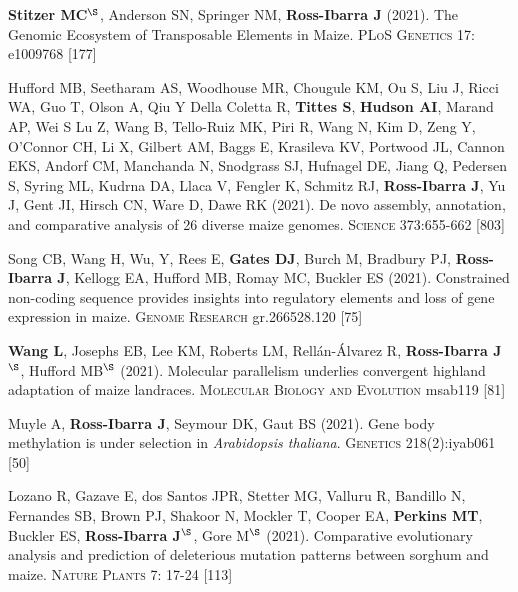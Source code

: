 \documentclass[letterpaper,10pt]{article}
\begin{document}
\begin{etaremune}
\item \textbf{Stitzer MC}$^\S$, Anderson SN, Springer NM, \textbf{Ross-Ibarra J} (2021). The Genomic Ecosystem of Transposable Elements in Maize. \textsc{PLoS Genetics} 17: e1009768
{} [177]\\

\item Hufford MB, Seetharam AS, Woodhouse MR, Chougule KM, Ou S, Liu J, Ricci WA, Guo T, Olson A, Qiu Y Della Coletta R, \textbf{Tittes S}, \textbf{Hudson AI},  Marand AP, Wei S Lu Z, Wang B, Tello-Ruiz MK, Piri R, Wang N, Kim D, Zeng Y, O'Connor CH, Li X, Gilbert AM, Baggs E, Krasileva KV, Portwood JL, Cannon EKS, Andorf CM, Manchanda N, Snodgrass SJ, Hufnagel DE, Jiang Q, Pedersen S, Syring ML, Kudrna DA, Llaca V, Fengler K, Schmitz RJ, \textbf{Ross-Ibarra J}, Yu J, Gent JI, Hirsch CN, Ware D, Dawe RK (2021). De novo assembly, annotation, and comparative analysis of 26 diverse maize genomes. \textsc{Science} 373:655-662
{} [803]\\

\item Song CB, Wang H, Wu, Y, Rees E, \textbf{Gates DJ}, Burch M,  Bradbury PJ, \textbf{Ross-Ibarra J}, Kellogg EA, Hufford MB, Romay MC, Buckler ES (2021).  Constrained non-coding sequence provides insights into regulatory elements and loss of gene expression in maize. \textsc{Genome Research} gr.266528.120 %
{} [75]\\

\item \textbf{Wang L}, Josephs EB, Lee KM, Roberts LM, Rell\'{a}n-\'{A}lvarez R, \textbf{Ross-Ibarra J}$^\S$, Hufford MB$^\S$ (2021). Molecular parallelism underlies convergent highland adaptation of maize landraces. \textsc{Molecular Biology and Evolution} msab119 %
{} [81]\\

\item Muyle A, \textbf{Ross-Ibarra J}, Seymour DK, Gaut BS (2021). Gene body methylation is under selection in \textit{Arabidopsis thaliana}. \textsc{Genetics} 218(2):iyab061 %
{} [50]\\

\item Lozano R, Gazave E, dos Santos JPR, Stetter MG, Valluru R, Bandillo N, Fernandes SB, Brown PJ, Shakoor N, Mockler T, Cooper EA, \textbf{Perkins MT}, Buckler ES, \textbf{Ross-Ibarra J}$^\S$, Gore M$^\S$ (2021). Comparative evolutionary analysis and prediction of deleterious mutation patterns between sorghum and maize. \textsc{Nature Plants} 7: 17-24  %
{} [113]\\


\end{etaremune}
\end{document}
